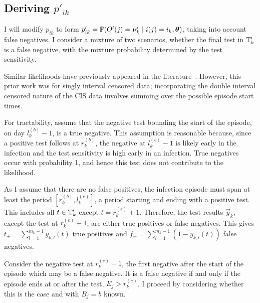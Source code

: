 \documentclass[thesis.tex]{subfiles}
\begin{document}
\subsection{Deriving $p'_{ik}$} \label{imperf-test:sec:modifying-p_ia}

I will modify $p_{ik}$ to form $p_{ik}' = \operatorname{\mathbb{P}}(O'(j) = \bm{\nu}'_k \mid i(j) = i_k, \bm{\theta})$, taking into account false negatives.
I consider a mixture of two scenarios, whether the final test in $\mathbb{T}'_{k}$ is a false negative, with the mixture probability determined by the test sensitivity.

Similar likelihoods have previously appeared in the literature~\autocite[e.g.][eq.\ (2)]{piresIntervalMisclassify}.
However, this prior work was for singly interval censored data; incorporating the double interval censored nature of the CIS data involves summing over the possible episode start times.


For tractability, assume that the negative test bounding the start of the episode, on day $l_k^{(b)}-1$, is a true negative.
This assumption is reasonable because, since a positive test follows at $r_k^{(b)}$, the negative at $l_k^{(b)}-1$ is likely early in the infection and the test sensitivity is high early in an infection.
True negatives occur with probability 1, and hence this test does not contribute to the likelihood.

As I assume that there are no false positives, the infection episode must span at least the period $[r^{(b)}_k, l^{(e)}_k]$, a period starting and ending with a positive test.
This includes all $t \in \mathbb{T}'_k$ except $t = r_k^{(e)}+1$.
Therefore, the test results $\vec{y}_k$, except the test at $r_k^{(e)}+1$, are either true positives or false negatives.
This gives $t_+ = \sum_{l=1}^{m_k-1} y_{k,l}(t)$ true positives and $f_- = \sum_{l=1}^{m_k-1} (1 - y_{k,l}(t))$ false negatives.

Consider the negative test at $r_k^{(e)}+1$, the first negative after the start of the episode which may be a false negative.
It is a false negative if and only if the episode ends at or after the test, \ie $E_j > r_k^{(e)}$.
I proceed by considering whether this is the case and with $B_j = b$ known.
\end{document}
